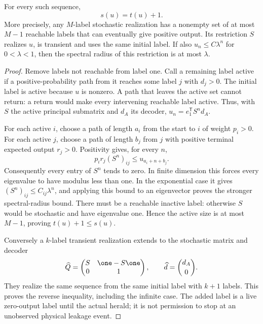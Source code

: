 \begin{lemma}\label{lem:r70-core}
For every such sequence,
\begin{equation}\label{eq:r70-core-count}
 s(u)=t(u)+1.
\end{equation}
More precisely, any $M$-label stochastic realization has a nonempty set of at most $M-1$ reachable labels that can eventually give positive output. Its restriction $S$ realizes $u$, is transient and uses the same initial label. If also $u_n\le C\lambda^n$ for $0<\lambda<1$, then the spectral radius of this restriction is at most $\lambda$.
\end{lemma}
\begin{proof}
Remove labels not reachable from label one. Call a remaining label active if a positive-probability path from it reaches some label $j$ with $d_j>0$. The initial label is active because $u$ is nonzero. A path that leaves the active set cannot return: a return would make every intervening reachable label active. Thus, with $S$ the active principal submatrix and $d_A$ its decoder, $u_n=e_1^{\mathsf T}S^nd_A$.

For each active $i$, choose a path of length $a_i$ from the start to $i$ of weight $p_i>0$. For each active $j$, choose a path of length $b_j$ from $j$ with positive terminal expected output $r_j>0$. Positivity gives, for every $n$,
\begin{equation}\label{eq:r70-path-bound}
 p_ir_j(S^n)_{ij}\le u_{a_i+n+b_j}.
\end{equation}
Consequently every entry of $S^n$ tends to zero. In finite dimension this forces every eigenvalue to have modulus less than one. In the exponential case it gives $(S^n)_{ij}\le C_{ij}\lambda^n$, and applying this bound to an eigenvector proves the stronger spectral-radius bound. There must be a reachable inactive label: otherwise $S$ would be stochastic and have eigenvalue one. Hence the active size is at most $M-1$, proving $t(u)+1\le s(u)$.

Conversely a $k$-label transient realization extends to the stochastic matrix and decoder
\begin{equation}\label{eq:r70-cemetery}
 \widehat Q=\begin{pmatrix}S&\one-S\one\\0&1\end{pmatrix},
 \qquad \widehat d=\binom{d_A}{0}.
\end{equation}
They realize the same sequence from the same initial label with $k+1$ labels. This proves the reverse inequality, including the infinite case. The added label is a live zero-output label until the actual herald; it is not permission to stop at an unobserved physical leakage event.
\end{proof}

